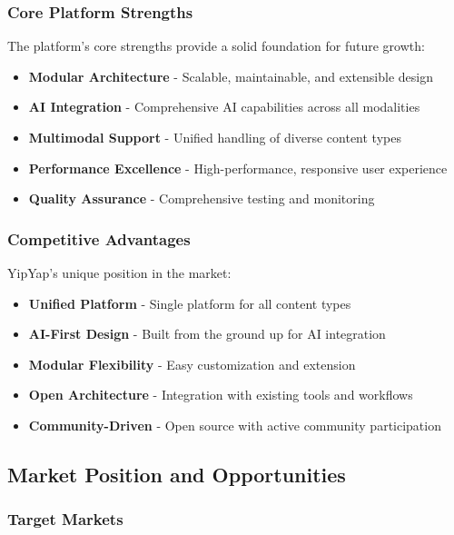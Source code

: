 \documentclass[11pt]{article}
\begin{document}
\subsubsection{Core Platform Strengths}

The platform's core strengths provide a solid foundation for future growth:

\begin{itemize}
\item \textbf{Modular Architecture} - Scalable, maintainable, and extensible design
\item \textbf{AI Integration} - Comprehensive AI capabilities across all modalities
\item \textbf{Multimodal Support} - Unified handling of diverse content types
\item \textbf{Performance Excellence} - High-performance, responsive user experience
\item \textbf{Quality Assurance} - Comprehensive testing and monitoring
\end{itemize}

\subsubsection{Competitive Advantages}

YipYap's unique position in the market:

\begin{itemize}
\item \textbf{Unified Platform} - Single platform for all content types
\item \textbf{AI-First Design} - Built from the ground up for AI integration
\item \textbf{Modular Flexibility} - Easy customization and extension
\item \textbf{Open Architecture} - Integration with existing tools and workflows
\item \textbf{Community-Driven} - Open source with active community participation
\end{itemize}

\subsection{Market Position and Opportunities}

\subsubsection{Target Markets}
\end{document}
